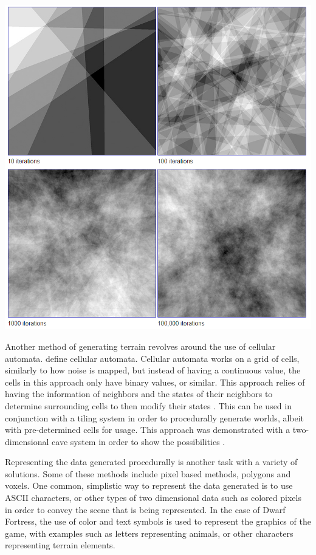 \documentclass[10pt]{report}
\begin{document}
		\begin{minipage}{\textwidth}
			\centering
			\includegraphics[scale=.5]{fractal-noise}
			\label{fig:fig2}
		\end{minipage}
		
		Another method of generating terrain revolves around the use of cellular automata. define cellular automata. Cellular automata works on a grid of cells, similarly to how noise is mapped, but instead of having a continuous value, the cells in this approach only have binary values, or similar. This approach relies of having the information of neighbors and the states of their neighbors to determine surrounding cells to then modify their states \cite{nature-of-code}. This can be used in conjunction with a tiling system in order to procedurally generate worlds, albeit with pre-determined cells for usage. This approach was demonstrated with a two-dimensional cave system in order to show the possibilities \cite{10.1145/1814256.1814266}.
	
		Representing the data generated procedurally is another task with a variety of solutions. Some of these methods include pixel based methods, polygons and voxels. One common, simplistic way to represent the data generated is to use ASCII characters, or other types of two dimensional data such as colored pixels in order to convey the scene that is being represented. In the case of Dwarf Fortress, the use of color and text symbols is used to represent the graphics of the game, with examples such as letters representing animals, or other characters representing terrain elements. 
		
\end{document}
